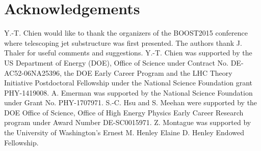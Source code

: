 \documentclass[aps,prl,floatfix,preprintnumbers,twocolumn,groupedaddress,nofootinbib]{revtex4-1}
\begin{document}
\section{Acknowledgements}
Y.-T. Chien would like to thank the organizers of the BOOST2015 conference where telescoping jet substructure was first presented. The authors thank J. Thaler for useful comments and suggestions. Y.-T. Chien was supported by the US Department of Energy (DOE), Office of Science under Contract No. DE-AC52-06NA25396, the DOE Early Career Program and the LHC Theory Initiative Postdoctoral Fellowship under the National Science Foundation grant PHY-1419008. A. Emerman was supported by the National Science Foundation under Grant No. PHY-1707971. S.-C. Hsu and S. Meehan were supported by the DOE Office of Science, Office of High Energy Physics Early Career Research program under Award Number DE-SC0015971. Z. Montague was supported by the University of Washington's Ernest M. Henley \text{\&} Elaine D. Henley Endowed Fellowship.



\end{document}
